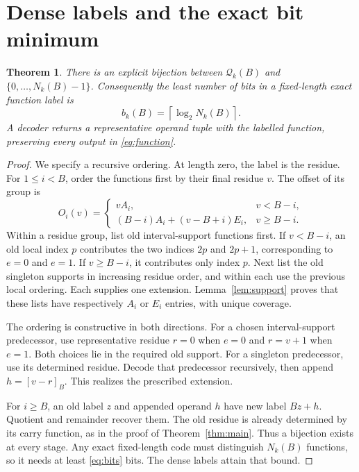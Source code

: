 \documentclass[11pt,a4paper]{article}
\newtheorem{theorem}{Theorem}
\theoremstyle{definition}\newtheorem{definition}[theorem]{Definition}
\newcommand{\Q}{\mathcal Q}
\begin{document}
\section{Dense labels and the exact bit minimum}
\begin{theorem}\label{thm:code}
There is an explicit bijection between $\Q_k(B)$ and
$\{0,\ldots,N_k(B)-1\}$. Consequently the least number of bits in a
fixed-length exact function label is
\begin{equation}\label{eq:bits}
 b_k(B)=\left\lceil\log_2 N_k(B)\right\rceil.
\end{equation}
A decoder returns a representative operand tuple with the labelled
function, preserving every output in \eqref{eq:function}.
\end{theorem}
\begin{proof}
We specify a recursive ordering. At length zero, the label is the residue.
For $1\leq i<B$, order the functions first by their final residue $v$.
The offset of its group is
\begin{equation}\label{eq:offset}
 O_i(v)=
 \begin{cases}
 vA_i,&v<B-i,\\
 (B-i)A_i+(v-B+i)E_i,&v\geq B-i.
 \end{cases}
\end{equation}
Within a residue group, list old interval-support functions first.
If $v<B-i$, an old local index $p$ contributes the two indices
$2p$ and $2p+1$, corresponding to $e=0$ and $e=1$.
If $v\geq B-i$, it contributes only index $p$.
Next list the old singleton supports in increasing residue order, and
within each use the previous local ordering. Each supplies one extension.
Lemma~\ref{lem:support} proves that these lists have respectively
$A_i$ or $E_i$ entries, with unique coverage.

The ordering is constructive in both directions.
For a chosen interval-support predecessor, use representative residue
$r=0$ when $e=0$ and $r=v+1$ when $e=1$.
Both choices lie in the required old support.
For a singleton predecessor, use its determined residue.
Decode that predecessor recursively, then append $h=[v-r]_B$.
This realizes the prescribed extension.

For $i\geq B$, an old label $z$ and appended operand $h$ have new label
$Bz+h$. Quotient and remainder recover them. The old residue is already
determined by its carry function, as in the proof of
Theorem~\ref{thm:main}.
Thus a bijection exists at every stage.
Any exact fixed-length code must distinguish $N_k(B)$ functions, so it
needs at least \eqref{eq:bits} bits. The dense labels attain that bound.
\end{proof}
\end{document}
